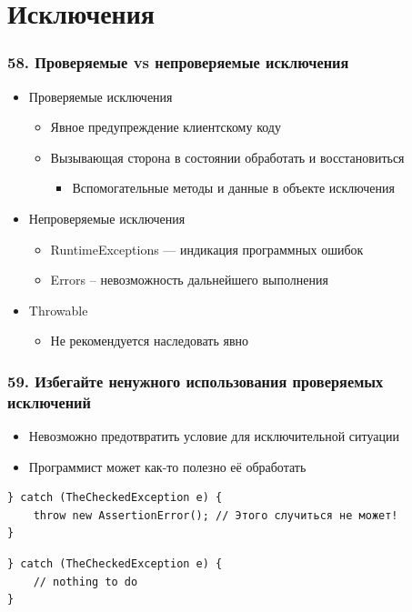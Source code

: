 \documentclass[xetex,mathserif,serif]{beamer}
\begin{document}
	\section{Исключения}

	\begin{frame}
		\frametitle{58. Проверяемые vs непроверяемые исключения}
		\begin{itemize}
			\item Проверяемые исключения
			\begin{itemize}
				\item Явное предупреждение клиентскому коду
				\item Вызывающая сторона в состоянии обработать и восстановиться
				\begin{itemize}
					\item Вспомогательные методы и данные в объекте исключения
				\end{itemize}
			\end{itemize}
			\item Непроверяемые исключения
			\begin{itemize}
				\item RuntimeExceptions --- индикация программных ошибок
				\item Errors -- невозможность дальнейшего выполнения
			\end{itemize}
			\item Throwable
			\begin{itemize}
				\item Не рекомендуется наследовать явно
			\end{itemize}
		\end{itemize}
	\end{frame}

	\begin{frame}[fragile]
		\frametitle{59. Избегайте ненужного использования проверяемых исключений}
		\begin{itemize}
			\item Невозможно предотвратить условие для исключительной ситуации
			\item Программист может как-то полезно её обработать
		\end{itemize}
		\begin{verbatim}
} catch (TheCheckedException е) {
    throw new AssertionError(); // Этого случиться не может!
}
		\end{verbatim}
		\vspace{3mm}
		\begin{verbatim}
} catch (TheCheckedException е) {
    // nothing to do
}
		\end{verbatim}
	\end{frame}
\end{document}
